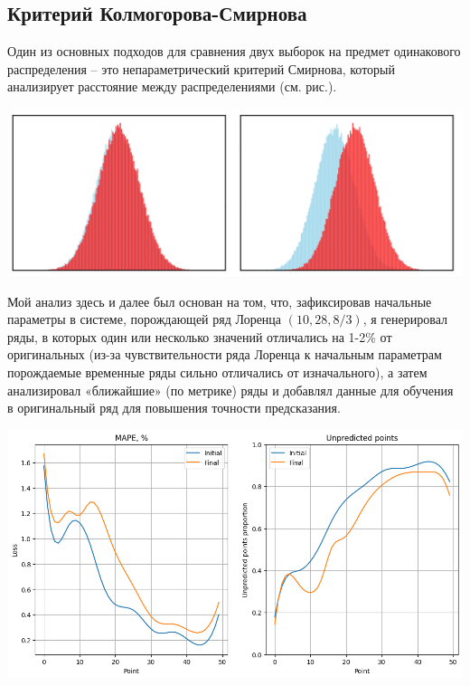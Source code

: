 \documentclass[a4paper, 12pt]{extarticle}
\begin{document}
\subsection{Критерий Колмогорова-Смирнова}

Один из основных подходов для сравнения двух выборок на предмет одинакового распределения – это непараметрический критерий Смирнова, который анализирует расстояние между распределениями (см. рис.).

\begin{center}
    \includegraphics[width=\textwidth]{img/colmogorov-smirnov.png}
\end{center}

Мой анализ здесь и далее был основан на том, что, зафиксировав начальные параметры в системе, порождающей ряд Лоренца $(10,28,8/3)$, я генерировал ряды, в которых один или несколько значений отличались на 1-2\% от оригинальных (из-за чувствительности ряда Лоренца к начальным параметрам порождаемые временные ряды сильно отличались от изначального), а затем анализировал «ближайшие» (по метрике) ряды и добавлял данные для обучения в оригинальный ряд для повышения точности предсказания.

\begin{center}
    \includegraphics[width=\textwidth]{img/colmogorov.png}
\end{center}
\end{document}
